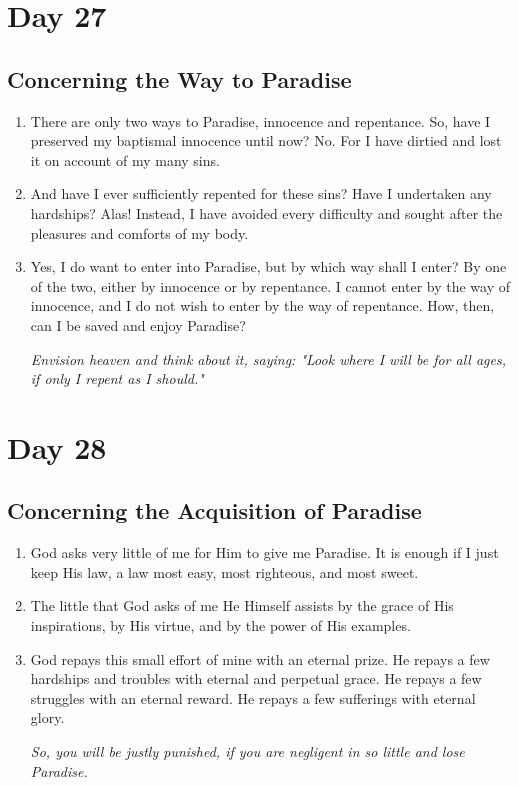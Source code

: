 \documentclass[11pt]{article}
\begin{document}
\section{Day 27}
\label{sec:orge6688d5}
\subsection{Concerning the Way to Paradise}
\label{sec:orgcf3fb22}
\begin{enumerate}
\item There are only two ways to Paradise, innocence and repentance. So, have I preserved my baptismal innocence until now? No. For I have dirtied and lost it on account of my many sins.
\item And have I ever sufficiently repented for these sins? Have I undertaken any hardships? Alas! Instead, I have avoided every difficulty and sought after the pleasures and comforts of my body.
\item Yes, I do want to enter into Paradise, but by which way shall I enter? By one of the two, either by innocence or by repentance. I cannot enter by the way of innocence, and I do not wish to enter by the
way of repentance. How, then, can I be saved and enjoy Paradise?

\emph{Envision heaven and think about it, saying: "Look where I will be for all ages, if only I repent as I should."}
\end{enumerate}
\section{Day 28}
\label{sec:org6bd92ba}
\subsection{Concerning the Acquisition of Paradise}
\label{sec:orga68d4fe}
\begin{enumerate}
\item God asks very little of me for Him to give me Paradise. It is enough if I just keep His law, a law most easy, most righteous, and most sweet.
\item The little that God asks of me He Himself assists by the grace of His inspirations, by His virtue, and by the power of His examples.
\item God repays this small effort of mine with an eternal prize. He repays a few hardships and troubles with eternal and perpetual grace.
He repays a few struggles with an eternal reward. He repays a few sufferings with eternal glory.

\emph{So, you will be justly punished, if you are negligent in so little and lose Paradise.}
\end{enumerate}
\end{document}
